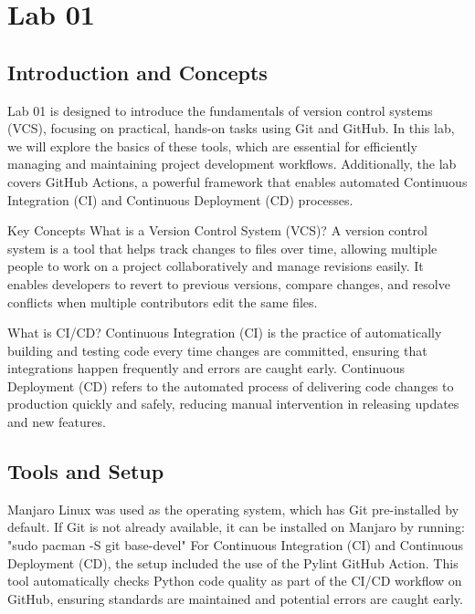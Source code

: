 \documentclass[a4paper,12pt,twoside,english]{all-in-one} %
\author{Chavda Haarit Ravindrakumar \\ \texttt{23110077}}
\begin{document}
\setlength{\baselineskip}{.70cm}

\begin{titlepage}
\maketitle\vfill
\thispagestyle{empty}
\end{titlepage}

\thispagestyle{plain}
\tableofcontents
\newpage

\pagestyle{\defaultsettings}

\section{Lab 01}
\subsection{Introduction and Concepts}
Lab 01 is designed to introduce the fundamentals of version control systems (VCS), focusing on practical, hands-on tasks using Git and GitHub. In this lab, we will explore the basics of these tools, which are essential for efficiently managing and maintaining project development workflows. Additionally, the lab covers GitHub Actions, a powerful framework that enables automated Continuous Integration (CI) and Continuous Deployment (CD) processes.

Key Concepts
What is a Version Control System (VCS)?
A version control system is a tool that helps track changes to files over time, allowing multiple people to work on a project collaboratively and manage revisions easily. It enables developers to revert to previous versions, compare changes, and resolve conflicts when multiple contributors edit the same files.

What is CI/CD?
Continuous Integration (CI) is the practice of automatically building and testing code every time changes are committed, ensuring that integrations happen frequently and errors are caught early. Continuous Deployment (CD) refers to the automated process of delivering code changes to production quickly and safely, reducing manual intervention in releasing updates and new features.

\subsection{Tools and Setup}
Manjaro Linux was used as the operating system, which has Git pre-installed by default. If Git is not already available, it can be installed on Manjaro by running:
"sudo pacman -S git base-devel"
For Continuous Integration (CI) and Continuous Deployment (CD), the setup included the use of the Pylint GitHub Action. This tool automatically checks Python code quality as part of the CI/CD workflow on GitHub, ensuring standards are maintained and potential errors are caught early.
\end{document}
